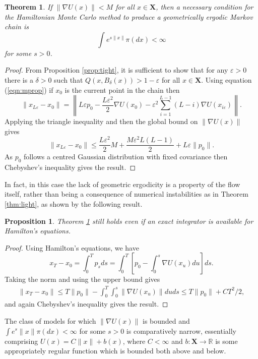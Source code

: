 \documentclass[bj,numbers,noshowframe]{imsart}
\newcommand{\X}{\mathbf{X}}
\newcommand{\R}{\mathbb{R}}
\newcommand{\e}{\varepsilon}
\theoremstyle{definition}
\theoremstyle{plain}
\newtheorem{thm}[defn]{Theorem}
\newtheorem{prop}[defn]{Proposition}
\theoremstyle{definition}
\begin{document}
\begin{thm} \label{thm:heavy}
If $\|\nabla U(x)\| <M$ for all $x \in \X$, then a \emph{necessary} condition for the Hamiltonian Monte Carlo method to produce a geometrically ergodic Markov chain is
\[
\int e^{s\|x\|}\pi(dx) < \infty
\]
for some $s>0$.
\end{thm}

\begin{proof}
From Proposition \ref{prop:tight}, it is sufficient to show that for any $\e>0$ there is a $\delta >0$ such that $Q(x,B_\delta(x)) > 1-\e$ for all $x \in \X$.  Using equation (\ref{eqn:mprop}) if $x_0$ is the current point in the chain then
\[
\|x_{L\e} - x_0\| = \left\| L\e p_0 - \frac{L\e^2}{2}\nabla U(x_0) - \e^2\sum_{i=1}^{L-1} (L-i)\nabla U(x_{i\e}) \right\|.
\]
Applying the triangle inequality and then the global bound on $\|\nabla U(x)\|$ gives
\[
\|x_{L\e} - x_0\| \leq \frac{L\e^2}{2}M + \frac{M\e^2 L(L-1)}{2} + L\e \|p_0\|.
\]
As $p_0$ follows a centred Gaussian distribution with fixed covariance then Chebyshev's inequality gives the result.
\end{proof}

In fact, in this case the lack of geometric ergodicity is a property of the flow itself, rather than being a consequence of numerical instabilities as in Theorem \ref{thm:light}, as shown by the following result.

\begin{prop} \label{prop:heavyexact}
Theorem \ref{thm:heavy} still holds even if an exact integrator is available for Hamilton's equations.
\end{prop}

\begin{proof}
Using Hamilton's equations, we have
\begin{equation}
x_T - x_0 = \int_0^T p_s ds = \int_0^T \left[ p_0 - \int_0^s \nabla U(x_u) du \right] ds.
\end{equation}
Taking the norm and using the upper bound gives
\begin{align*}
\|x_T - x_0\| \leq T\|p_0\| - \int_0^T \int_0^s \|\nabla U(x_u)\| duds \leq T\|p_0\| + CT^2/2,
\end{align*}
and again Chebyshev's inequality gives the result.
\end{proof}

The class of models for which $\|\nabla U(x)\|$ is bounded and $\int e^s\|x\|\pi(dx)<\infty$ for some $s>0$ is comparatively narrow, essentially comprising $U(x) = C\|x\| + b(x)$, where $C<\infty$ and $b:\X\to\R$ is some appropriately regular function which is bounded both above and below.
\end{document}
